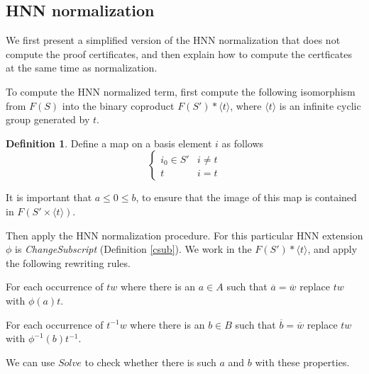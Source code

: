 \documentclass[12pt]{article} %
\theoremstyle{definition}
\theoremstyle{definition}
\theoremstyle{definition}
\theoremstyle{definition}
\theoremstyle{definition}
\newtheorem{defn}[theorem]{Definition}
\theoremstyle{definition}
\begin{document}
\subsection{HNN normalization}\label{HNNnorm}

We first present a simplified version of the HNN normalization that does not compute
the proof certificates, and then explain how to compute the certficates at the
same time as normalization.

To compute the HNN normalized term,
first compute the following isomorphism from $F(S)$ into the binary
coproduct $F(S') \ast \langle t \rangle$, where $\langle t \rangle$ is an infinite
cyclic group generated by $t$.

\begin{defn}\label{tocoprod}
  Define a map on a basis element $i$ as follows
  \begin{equation}
    \begin{cases}
      i_0 \in S' & i \ne t \\
      t & i = t
    \end{cases}
  \end{equation}
\end{defn}

It is important that $a \le 0 \le b$, to ensure that the image
of this map is contained in $F(S' \times \langle t \rangle)$.

Then apply the HNN normalization procedure. For this particular HNN extension
$\phi$ is \textit{ChangeSubscript} (Definition \ref{csub}).
We work in the $F(S') \ast \langle t \rangle$, and apply the following rewriting rules.

For each occurrence of $tw$ where there is an $a \in A$ such that
$\overline{a} = \overline{w}$ replace $tw$ with $\phi(a)t$.

For each occurrence of $t^{-1}w$ where there is an $b \in B$ such that
$\overline{b} = \overline{w}$ replace $tw$ with $\phi^{-1}(b)t^{-1}$.

We can use $\textit{Solve}$ to check whether there is such $a$ and $b$ with
these properties.



\end{document}
